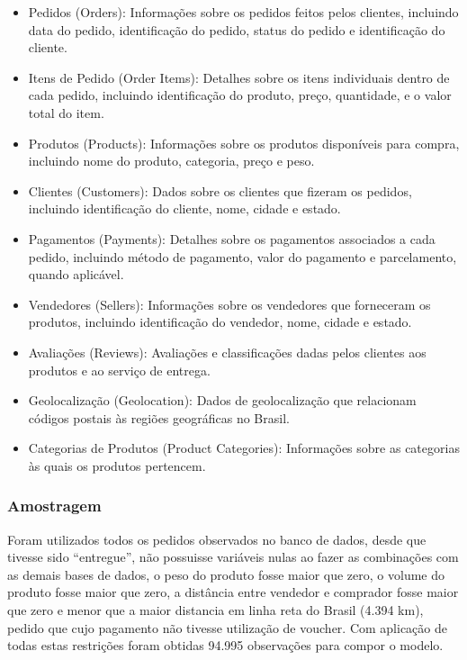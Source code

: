 \documentclass[
]{article}
\providecommand{\tightlist}{%
  \setlength{\itemsep}{0pt}\setlength{\parskip}{0pt}}
\begin{document}
\begin{itemize}
\tightlist
\item
  Pedidos (Orders): Informações sobre os pedidos feitos pelos clientes,
  incluindo data do pedido, identificação do pedido, status do pedido e
  identificação do cliente.
\item
  Itens de Pedido (Order Items): Detalhes sobre os itens individuais
  dentro de cada pedido, incluindo identificação do produto, preço,
  quantidade, e o valor total do item.
\item
  Produtos (Products): Informações sobre os produtos disponíveis para
  compra, incluindo nome do produto, categoria, preço e peso.
\item
  Clientes (Customers): Dados sobre os clientes que fizeram os pedidos,
  incluindo identificação do cliente, nome, cidade e estado.
\item
  Pagamentos (Payments): Detalhes sobre os pagamentos associados a cada
  pedido, incluindo método de pagamento, valor do pagamento e
  parcelamento, quando aplicável.
\item
  Vendedores (Sellers): Informações sobre os vendedores que forneceram
  os produtos, incluindo identificação do vendedor, nome, cidade e
  estado.
\item
  Avaliações (Reviews): Avaliações e classificações dadas pelos clientes
  aos produtos e ao serviço de entrega.
\item
  Geolocalização (Geolocation): Dados de geolocalização que relacionam
  códigos postais às regiões geográficas no Brasil.
\item
  Categorias de Produtos (Product Categories): Informações sobre as
  categorias às quais os produtos pertencem.
\end{itemize}

\hypertarget{amostragem}{%
\subsubsection{Amostragem}\label{amostragem}}

Foram utilizados todos os pedidos observados no banco de dados, desde
que tivesse sido ``entregue'', não possuisse variáveis nulas ao fazer as
combinações com as demais bases de dados, o peso do produto fosse maior
que zero, o volume do produto fosse maior que zero, a distância entre
vendedor e comprador fosse maior que zero e menor que a maior distancia
em linha reta do Brasil (4.394 km), pedido que cujo pagamento não
tivesse utilização de voucher. Com aplicação de todas estas restrições
foram obtidas 94.995 observações para compor o modelo.
\end{document}
